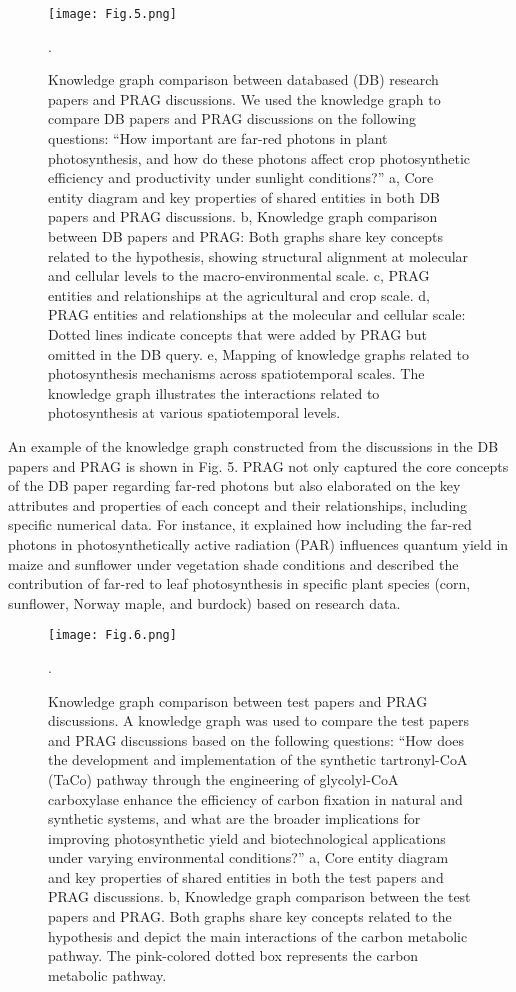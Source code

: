 \documentclass[12pt]{article}
\begin{document}
\begin{figure}
    \centering
    \texttt{[image: Fig.5.png]}
    \caption{Knowledge graph comparison between databased (DB) research papers and PRAG discussions. We used the knowledge graph to compare DB papers and PRAG discussions on the following questions: “How important are far-red photons in plant photosynthesis, and how do these photons affect crop photosynthetic efficiency and productivity under sunlight conditions?” a, Core entity diagram and key properties of shared entities in both DB papers and PRAG discussions. b, Knowledge graph comparison between DB papers and PRAG: Both graphs share key concepts related to the hypothesis, showing structural alignment at molecular and cellular levels to the macro-environmental scale. c, PRAG entities and relationships at the agricultural and crop scale. d, PRAG entities and relationships at the molecular and cellular scale: Dotted lines indicate concepts that were added by PRAG but omitted in the DB query. e, Mapping of knowledge graphs related to photosynthesis mechanisms across spatiotemporal scales. The knowledge graph illustrates the interactions related to photosynthesis at various spatiotemporal levels.}.
    \label{fig:prag}
\end{figure}

An example of the knowledge graph constructed from the discussions in the DB papers and PRAG is shown in Fig. 5. PRAG not only captured the core concepts of the DB paper regarding far-red photons but also elaborated on the key attributes and properties of each concept and their relationships, including specific numerical data. For instance, it explained how including the far-red photons in photosynthetically active radiation (PAR) influences quantum yield in maize and sunflower under vegetation shade conditions and described the contribution of far-red to leaf photosynthesis in specific plant species (corn, sunflower, Norway maple, and burdock) based on research data.

\begin{figure}
    \centering
    \texttt{[image: Fig.6.png]}
    \caption{Knowledge graph comparison between test papers and PRAG discussions. A knowledge graph was used to compare the test papers and PRAG discussions based on the following questions: “How does the development and implementation of the synthetic tartronyl-CoA (TaCo) pathway through the engineering of glycolyl-CoA carboxylase enhance the efficiency of carbon fixation in natural and synthetic systems, and what are the broader implications for improving photosynthetic yield and biotechnological applications under varying environmental conditions?” a, Core entity diagram and key properties of shared entities in both the test papers and PRAG discussions. b, Knowledge graph comparison between the test papers and PRAG. Both graphs share key concepts related to the hypothesis and depict the main interactions of the carbon metabolic pathway. The pink-colored dotted box represents the carbon metabolic pathway.}.
    \label{fig:prag}
\end{figure}
\end{document}
